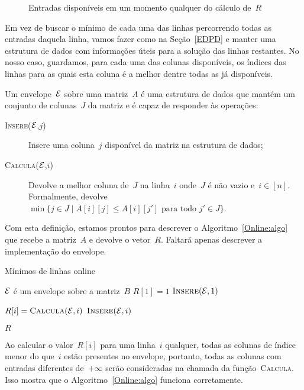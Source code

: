 \begin{figure}[h]
    \centering
    
    \caption{Entradas disponíveis em um momento qualquer do cálculo de~$R$} \label{Online:dep:fig}
\end{figure}

Em vez de buscar o mínimo de cada uma das linhas percorrendo todas as entradas daquela linha, vamos fazer como na Seção~\ref{EDPD} e manter uma estrutura de dados com informações úteis para a solução das linhas restantes. No nosso caso, guardamos, para cada uma das colunas disponíveis, os índices das linhas para as quais esta coluna é a melhor dentre todas as já disponíveis. 

\begin{defi}
Um envelope~$\mathcal{E}$ sobre uma matriz~$A$ é uma estrutura de dados que mantém um conjunto de colunas~$J$ da matriz e é capaz de responder às operações:

\begin{description}
    \item[\textsc{Insere}($\mathcal{E}$,$j$)] Insere uma coluna~$j$ disponível da matriz na estrutura de dados;
    \item[\textsc{Calcula}($\mathcal{E}$,$i$)] Devolve a melhor coluna de~$J$ na linha~$i$ onde~$J$ é não vazio e~${ i \in [n] }$. Formalmente, devolve~${ \min\{j \in J \mid A[i][j] \leq A[i][j'] \text{ para todo } j' \in J\} }$.
\end{description}
\end{defi}

Com esta definição, estamos prontos para descrever o Algoritmo~\ref{Online:algo} que recebe a matriz~$A$ e devolve o vetor~$R$. Faltará apenas descrever a implementação do envelope.

\begin{algorithm}[h]
\caption{Mínimos de linhas online}
\label{Online:algo}
\begin{algorithmic}[1]
    \State $\mathcal{E}$ é um envelope sobre a matriz~$B$
    \State $R[1] = 1$
    \State $\textsc{Insere}(\mathcal{E},1)$

     \label{Online:algo:loop}
        \State $R[i] = \textsc{Calcula}(\mathcal{E},i)$
        \State $\textsc{Insere}(\mathcal{E},i)$
    \EndFor

    \State \Return $R$
\EndFunction
\end{algorithmic}
\end{algorithm}

Ao calcular o valor~$R[i]$ para uma linha~$i$ qualquer, todas as colunas de índice menor do que~$i$ estão presentes no envelope, portanto, todas as colunas com entradas diferentes de~$+\infty$ serão consideradas na chamada da função~\textsc{Calcula}. Isso mostra que o Algoritmo~\ref{Online:algo} funciona corretamente.

